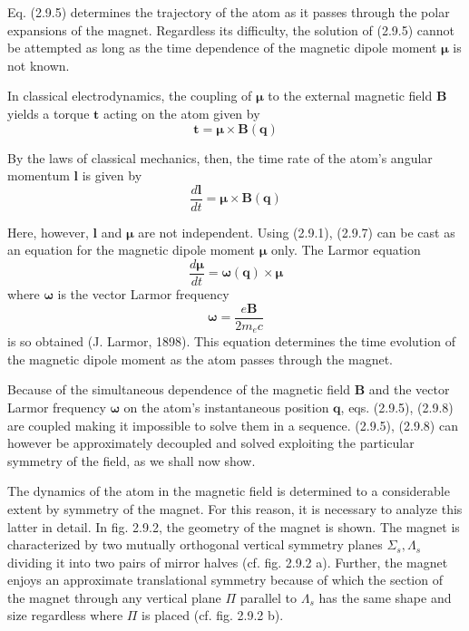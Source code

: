\documentclass{article}
\begin{document}
Eq. (2.9.5) determines the trajectory of the atom as it passes through the polar expansions of the magnet. Regardless its difficulty, the solution of (2.9.5) cannot be attempted as long as the time dependence of the magnetic dipole moment $\boldsymbol{\mu}$ is not known.

In classical electrodynamics, the coupling of $\boldsymbol{\mu}$ to the external magnetic field
$\boldsymbol{B}$ yields a torque $\boldsymbol{t}$ acting on the atom given by
$$
\begin{equation*}
\boldsymbol{t}=\boldsymbol{\mu} \times \boldsymbol{B}(\boldsymbol{q}) \tag{2.9.6}
\end{equation*}
$$

By the laws of classical mechanics, then, the time rate of the atom's angular momentum $\boldsymbol{l}$ is given by
$$
\begin{equation*}
\frac{d \boldsymbol{l}}{d t}=\boldsymbol{\mu} \times \boldsymbol{B}(\boldsymbol{q}) \tag{2.9.7}
\end{equation*}
$$

Here, however, $\boldsymbol{l}$ and $\boldsymbol{\mu}$ are not independent. Using (2.9.1), (2.9.7) can be cast as an equation for the magnetic dipole moment $\boldsymbol{\mu}$ only. The Larmor equation
$$
\begin{equation*}
\frac{d \boldsymbol{\mu}}{d t}=\boldsymbol{\omega}(\boldsymbol{q}) \times \boldsymbol{\mu} \tag{2.9.8}
\end{equation*}
$$
where $\boldsymbol{\omega}$ is the vector Larmor frequency
$$
\begin{equation*}
\boldsymbol{\omega}=\frac{e \boldsymbol{B}}{2 m_{e} c} \tag{2.9.9}
\end{equation*}
$$
is so obtained (J. Larmor, 1898). This equation determines the time evolution of the magnetic dipole moment as the atom passes through the magnet.

Because of the simultaneous dependence of the magnetic field $\boldsymbol{B}$ and the vector Larmor frequency $\boldsymbol{\omega}$ on the atom's instantaneous position $\boldsymbol{q}$, eqs. (2.9.5), (2.9.8) are coupled making it impossible to solve them in a sequence. (2.9.5), (2.9.8) can however be approximately decoupled and solved exploiting the particular symmetry of the field, as we shall now show.

The dynamics of the atom in the magnetic field is determined to a considerable extent by symmetry of the magnet. For this reason, it is necessary to analyze this latter in detail. In fig. 2.9.2, the geometry of the magnet is shown. The magnet is characterized by two mutually orthogonal vertical symmetry planes $\Sigma_{s}, \Lambda_{s}$ dividing it into two pairs of mirror halves (cf. fig. 2.9.2 a). Further, the magnet enjoys an approximate translational symmetry because of which the section of the magnet through any vertical plane $\Pi$ parallel to $\Lambda_{s}$ has the same shape and size regardless where $\Pi$ is placed (cf. fig. 2.9.2 b).
\end{document}
